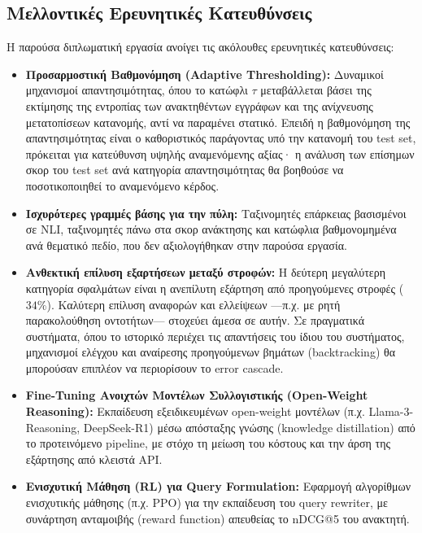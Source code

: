 \subsection{Μελλοντικές Ερευνητικές Κατευθύνσεις}

Η παρούσα διπλωματική εργασία ανοίγει τις ακόλουθες ερευνητικές κατευθύνσεις:
\begin{itemize}
    \item \textbf{Προσαρμοστική Βαθμονόμηση (Adaptive Thresholding):} Δυναμικοί μηχανισμοί απαντησιμότητας, όπου το κατώφλι $\tau$ μεταβάλλεται βάσει της εκτίμησης της εντροπίας των ανακτηθέντων εγγράφων και της ανίχνευσης μετατοπίσεων κατανομής, αντί να παραμένει στατικό. Επειδή η βαθμονόμηση της απαντησιμότητας είναι ο καθοριστικός παράγοντας υπό την κατανομή του test set, πρόκειται για κατεύθυνση υψηλής αναμενόμενης αξίας· η ανάλυση των επίσημων σκορ του test set ανά κατηγορία απαντησιμότητας θα βοηθούσε να ποσοτικοποιηθεί το αναμενόμενο κέρδος.
    \item \textbf{Ισχυρότερες γραμμές βάσης για την πύλη:} Ταξινομητές επάρκειας βασισμένοι σε NLI, ταξινομητές πάνω στα σκορ ανάκτησης και κατώφλια βαθμονομημένα ανά θεματικό πεδίο, που δεν αξιολογήθηκαν στην παρούσα εργασία.
    \item \textbf{Ανθεκτική επίλυση εξαρτήσεων μεταξύ στροφών:} Η δεύτερη μεγαλύτερη κατηγορία σφαλμάτων είναι η ανεπίλυτη εξάρτηση από προηγούμενες στροφές ($34\%$). Καλύτερη επίλυση αναφορών και ελλείψεων ---π.χ. με ρητή παρακολούθηση οντοτήτων--- στοχεύει άμεσα σε αυτήν. Σε πραγματικά συστήματα, όπου το ιστορικό περιέχει τις απαντήσεις του ίδιου του συστήματος, μηχανισμοί ελέγχου και αναίρεσης προηγούμενων βημάτων (backtracking) θα μπορούσαν επιπλέον να περιορίσουν το error cascade.
    \item \textbf{Fine-Tuning Ανοιχτών Μοντέλων Συλλογιστικής (Open-Weight Reasoning):} Εκπαίδευση εξειδικευμένων open-weight μοντέλων (π.χ. Llama-3-Reasoning, DeepSeek-R1) μέσω απόσταξης γνώσης (knowledge distillation) από το προτεινόμενο pipeline, με στόχο τη μείωση του κόστους και την άρση της εξάρτησης από κλειστά API.
    \item \textbf{Ενισχυτική Μάθηση (RL) για Query Formulation:} Εφαρμογή αλγορίθμων ενισχυτικής μάθησης (π.χ. PPO) για την εκπαίδευση του query rewriter, με συνάρτηση ανταμοιβής (reward function) απευθείας το nDCG@5 του ανακτητή.
\end{itemize}

